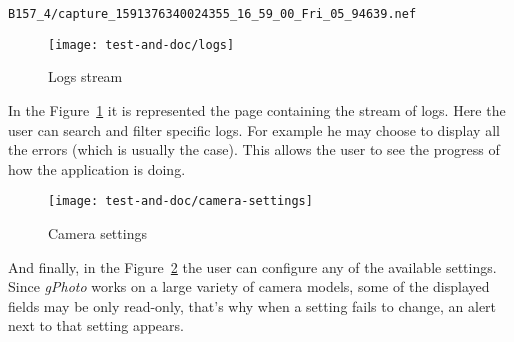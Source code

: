 \begin{center}
   \verb|B157_4/capture_1591376340024355_16_59_00_Fri_05_94639.nef|
\end{center}

\vspace{0.3cm}
\begin{figure}[!ht]
   \centering
   \texttt{[image: test-and-doc/logs]}
   \caption{Logs stream}\label{logs}
\end{figure}

In the \mbox{Figure \ref{logs}} it is represented the page containing the stream of logs. Here the user can search and filter specific logs. For example he may choose to display all the errors (which is usually the case). This allows the user to see the progress of how the application is doing.

\vspace{0.3cm}
\begin{figure}[!ht]
   \centering
   \texttt{[image: test-and-doc/camera-settings]}
   \caption{Camera settings}\label{camera-settings}
\end{figure}

And finally, in the \mbox{Figure \ref{camera-settings}} the user can configure any of the available settings. Since \textit{gPhoto} works on a large variety of camera models, some of the displayed fields may be only read-only, that's why when a setting fails to change, an alert next to that setting appears.
